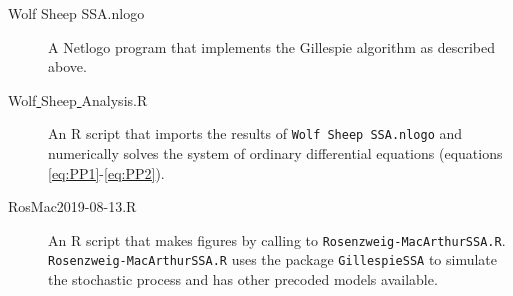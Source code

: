 \documentclass[11pt, oneside]{article}   	%
\begin{document}
\begin{description}
\item[Wolf Sheep SSA.nlogo] A Netlogo program that implements the Gillespie algorithm as described above.
\item[Wolf\underline{ }Sheep\underline{ }Analysis.R] An R script that imports the results of \texttt{Wolf Sheep SSA.nlogo} and numerically solves the system of ordinary differential equations (equations \ref{eq:PP1}-\ref{eq:PP2}).
\item[RosMac2019-08-13.R] An R script that makes figures by calling to \texttt{Rosenzweig-MacArthurSSA.R}. \texttt{Rosenzweig-MacArthurSSA.R} uses the package \texttt{GillespieSSA} to simulate the stochastic process and has other precoded models available.
\end{description}
\end{document}
